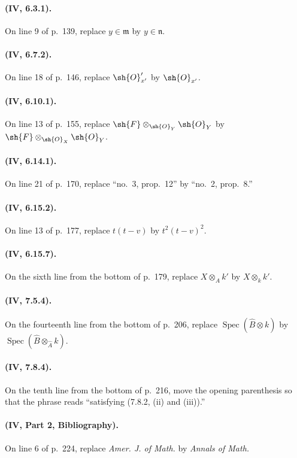 \paragraph{(IV, 6.3.1).}
On line 9 of p.~139, replace $y\in\mathfrak m$ by $y\in\mathfrak n$.

\paragraph{(IV, 6.7.2).}
On line 18 of p.~146, replace $\sh{O}'_{x'}$ by $\sh{O}_{x'}$.

\paragraph{(IV, 6.10.1).}
On line 13 of p.~155, replace
$\sh{F}\otimes_{\sh{O}_Y}\sh{O}_Y$ by
$\sh{F}\otimes_{\sh{O}_X}\sh{O}_Y$.

\paragraph{(IV, 6.14.1).}
On line 21 of p.~170, replace ``no.~3, prop.~12'' by
``no.~2, prop.~8.''

\paragraph{(IV, 6.15.2).}
On line 13 of p.~177, replace $t(t-v)$ by $t^2(t-v)^2$.

\paragraph{(IV, 6.15.7).}
On the sixth line from the bottom of p.~179, replace
$X\otimes_Ak'$ by $X\otimes_kk'$.

\paragraph{(IV, 7.5.4).}
On the fourteenth line from the bottom of p.~206, replace
$\operatorname{Spec}(\widehat B\otimes k)$ by
$\operatorname{Spec}(\widehat B\otimes_{\widehat A}k)$.

\paragraph{(IV, 7.8.4).}
On the tenth line from the bottom of p.~216, move the opening parenthesis
so that the phrase reads ``satisfying (7.8.2, (ii) and (iii)).''

\paragraph{(IV, Part 2, Bibliography).}
On line 6 of p.~224, replace \emph{Amer. J. of Math.} by
\emph{Annals of Math.}

